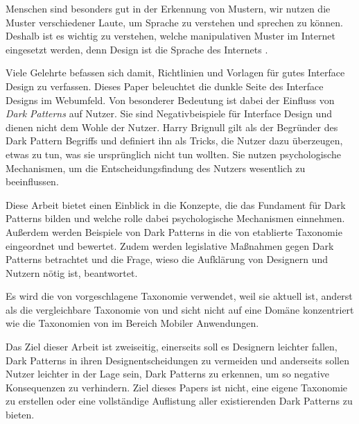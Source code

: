 \documentclass[conference,compsoc,final,a4paper]{IEEEtran}
\begin{document}
Menschen sind besonders gut in der Erkennung von Mustern, wir nutzen die Muster verschiedener Laute, um Sprache zu verstehen und sprechen zu können. Deshalb ist es wichtig zu verstehen, welche manipulativen Muster im Internet eingesetzt werden, denn Design ist die Sprache des Internets \autocite{Nerdwriter1_YT_2018}.

Viele Gelehrte befassen sich damit, Richtlinien und Vorlagen für gutes Interface Design zu verfassen. Dieses Paper beleuchtet die dunkle Seite des Interface Designs im Webumfeld. Von besonderer Bedeutung ist dabei der Einfluss von \textit{Dark Patterns} auf Nutzer. Sie sind Negativbeispiele für Interface Design und dienen nicht dem Wohle der Nutzer. Harry Brignull \autocite{Brignull} gilt als der Begründer des Dark Pattern Begriffs und definiert ihn als Tricks, die Nutzer dazu überzeugen, etwas zu tun, was sie ursprünglich nicht tun wollten. Sie nutzen psychologische Mechanismen, um die Entscheidungsfindung des Nutzers wesentlich zu beeinflussen.

Diese Arbeit bietet einen Einblick in die Konzepte, die das Fundament für Dark Patterns bilden und welche rolle dabei psychologische Mechanismen einnehmen. Außerdem werden Beispiele von Dark Patterns in die von \citeauthor{Gray_2018} \autocite{Gray_2018} etablierte Taxonomie eingeordnet und bewertet. Zudem werden legislative Maßnahmen gegen Dark Patterns betrachtet und die Frage, wieso die Aufklärung von Designern und Nutzern nötig ist, beantwortet.

Es wird die von \citeauthor*{Gray_2018} \autocite{Gray_2018} vorgeschlagene Taxonomie verwendet, weil sie aktuell ist, anderst als die vergleichbare Taxonomie von \citeauthor{Conti2010} \autocite{Conti2010} und sicht nicht auf eine Domäne konzentriert wie die Taxonomien von \citeauthor{Lewis2014} \autocite{Lewis2014} im Bereich Mobiler Anwendungen.


Das Ziel dieser Arbeit ist zweiseitig, einerseits soll es Designern leichter fallen, Dark Patterns in ihren Designentscheidungen zu vermeiden und anderseits sollen Nutzer leichter in der Lage sein, Dark Patterns zu erkennen, um so negative Konsequenzen zu verhindern. Ziel dieses Papers ist nicht, eine eigene Taxonomie zu erstellen oder eine vollständige Auflistung aller existierenden Dark Patterns zu bieten.
\end{document}
